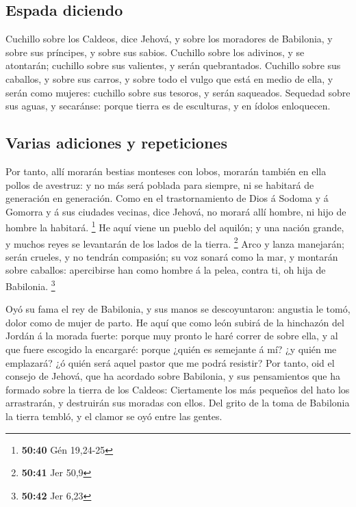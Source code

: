 \hypertarget{espada-diciendo}{%
\subsection{Espada diciendo}\label{espada-diciendo}}

 Cuchillo sobre los Caldeos, dice Jehová, y sobre los
moradores de Babilonia, y sobre sus príncipes, y sobre sus sabios.
 Cuchillo sobre los adivinos, y se atontarán; cuchillo
sobre sus valientes, y serán quebrantados.  Cuchillo sobre
sus caballos, y sobre sus carros, y sobre todo el vulgo que está en
medio de ella, y serán como mujeres: cuchillo sobre sus tesoros, y serán
saqueados.  Sequedad sobre sus aguas, y secaránse: porque
tierra es de esculturas, y en ídolos enloquecen.

\hypertarget{varias-adiciones-y-repeticiones}{%
\subsection{Varias adiciones y
repeticiones}\label{varias-adiciones-y-repeticiones}}

 Por tanto, allí morarán bestias monteses con lobos,
morarán también en ella pollos de avestruz: y no más será poblada para
siempre, ni se habitará de generación en generación.  Como
en el trastornamiento de Dios á Sodoma y á Gomorra y á sus ciudades
vecinas, dice Jehová, no morará allí hombre, ni hijo de hombre la
habitará. \footnote{\textbf{50:40} Gén 19,24-25}  He aquí
viene un pueblo del aquilón; y una nación grande, y muchos reyes se
levantarán de los lados de la tierra. \footnote{\textbf{50:41} Jer 50,9}
 Arco y lanza manejarán; serán crueles, y no tendrán
compasión; su voz sonará como la mar, y montarán sobre caballos:
apercibirse han como hombre á la pelea, contra ti, oh hija de Babilonia.
\footnote{\textbf{50:42} Jer 6,23}

 Oyó su fama el rey de Babilonia, y sus manos se
descoyuntaron: angustia le tomó, dolor como de mujer de parto.
 He aquí que como león subirá de la hinchazón del Jordán á
la morada fuerte: porque muy pronto le haré correr de sobre ella, y al
que fuere escogido la encargaré: porque ¿quién es semejante á mí? ¿y
quién me emplazará? ¿ó quién será aquel pastor que me podrá resistir?
 Por tanto, oid el consejo de Jehová, que ha acordado sobre
Babilonia, y sus pensamientos que ha formado sobre la tierra de los
Caldeos: Ciertamente los más pequeños del hato los arrastrarán, y
destruirán sus moradas con ellos.  Del grito de la toma de
Babilonia la tierra tembló, y el clamor se oyó entre las gentes.

